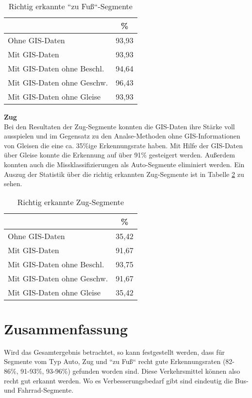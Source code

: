 \begin{table}[h]
\centering
\begin{tabular}{|l|c|}
\hline
 & \% \\ \hline
Ohne GIS-Daten & 93,93 \\ \hline
Mit GIS-Daten & 93,93 \\ \hline
Mit GIS-Daten ohne Beschl. & 94,64 \\ \hline
Mit GIS-Daten ohne Geschw. & 96,43 \\ \hline
Mit GIS-Daten ohne Gleise & 93,93 \\ \hline
\end{tabular}
\caption{Richtig erkannte ``zu Fuß``-Segmente}
\label{resultat-foot}
\end{table}

\textbf{Zug} \\
Bei den Resultaten der Zug-Segmente konnten die GIS-Daten ihre Stärke voll ausspielen und im Gegensatz zu den Analse-Methoden ohne GIS-Informationen von Gleisen die eine ca. 35\%ige Erkennungsrate haben. Mit Hilfe der GIS-Daten über Gleise konnte die Erkennung auf über 91\% gesteigert werden. Außerdem konnten auch die Missklassifizierungen als Auto-Segmente eliminiert werden. Ein Auszug der Statistik über die richtig erkannten Zug-Segmente ist in Tabelle \ref{result-train} zu sehen.

\begin{table}[h]
\centering
\begin{tabular}{|l|c|}
\hline
 & \% \\ \hline
Ohne GIS-Daten & 35,42 \\ \hline
Mit GIS-Daten & 91,67 \\ \hline
Mit GIS-Daten ohne Beschl. & 93,75 \\ \hline
Mit GIS-Daten ohne Geschw. & 91,67 \\ \hline
Mit GIS-Daten ohne Gleise & 35,42 \\ \hline
\end{tabular}
\caption{Richtig erkannte Zug-Segmente}
\label{result-train}
\end{table}

\section{Zusammenfassung}
Wird das Gesamtergebnis betrachtet, so kann festgestellt werden, dass für Segmente vom Typ Auto, Zug und ``zu Fuß`` recht gute Erkennungsraten (82-86\%, 91-93\%, 93-96\%) gefunden worden sind. Diese Verkehrsmittel können also recht gut erkannt werden. Wo es Verbesserungsbedarf gibt sind eindeutig die Bus- und Fahrrad-Segmente.  

